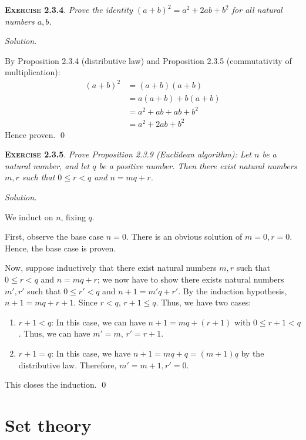 \documentclass[12pt]{article}
\theoremstyle{remark}
\newenvironment{exer}[2]{
    \noindent \setlength{\parskip}{1em}%
    \textsc{\textbf{Exercise #1}}. \textit{#2} \par
    \noindent \textit{Solution.} %
}{\bigskip}
\begin{document}
\begin{exer}{2.3.4}{
    Prove the identity $(a + b)^2 = a^2 + 2ab + b^2$ for all natural numbers $a, b$.
}
    By Proposition 2.3.4 (distributive law) and Proposition 2.3.5 (commutativity of multiplication):
    \begin{align*}
        (a+b)^2
        & = (a+b)(a+b) \\
        & = a(a + b) + b(a + b) \\
        & = a^2 + ab + ab + b^2 \\
        & = a^2 + 2ab + b^2
    \end{align*}
    Hence proven. \qed  %
\end{exer}


\begin{exer}{2.3.5}{
    Prove Proposition 2.3.9 (Euclidean algorithm):
    Let $n$ be a natural number, and let $q$ be a positive number.
    Then there exist natural numbers $m, r$ such that $0 \le r < q$ and $n = mq + r$.
}
    We induct on $n$, fixing $q$.

    First, observe the base case $n = 0$.
    There is an obvious solution of $m = 0, r = 0$.
    Hence, the base case is proven.

    Now, suppose inductively that there exist natural numbers $m, r$ such that $0 \le r < q$ and $n = mq + r$;
    we now have to show there exists natural numbers $m', r'$ such that $0 \le r' < q$ and $n+1 = m'q + r'$.
    By the induction hypothesis, $n + 1 = mq + r + 1$.
    Since $r < q$, $r + 1 \le q$.
    Thus, we have two cases:
    \begin{enumerate}[label=(\alph*), topsep=0mm]
        \item $r + 1 < q$: In this case, we can have $n + 1 = mq + (r + 1)$ with $0 \le r + 1 < q$. Thus, we can have $m' = m$, $r' = r + 1$.
        \item $r + 1 = q$: In this case, we have $n + 1 = mq + q = (m + 1)q$ by the distributive law. Therefore, $m' = m + 1, r' = 0$.
    \end{enumerate}
    This closes the induction. \qed
\end{exer}

\pagebreak


\section{Set theory}
\end{document}
